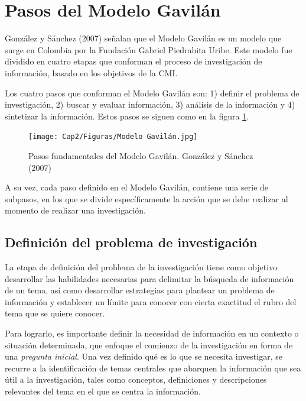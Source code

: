 \section{Pasos del Modelo Gavilán}
\label{secPasosCap2}

González y Sánchez (2007) señalan que el Modelo Gavilán es un modelo que surge en Colombia por la Fundación Gabriel Piedrahita Uribe. Este modelo fue dividido en cuatro etapas que conforman el proceso de investigación de información, basado en los objetivos de la CMI.

Los cuatro pasos que conforman el Modelo Gavilán son: 1) definir el problema de investigación, 2) buscar y evaluar información, 3) análisis de la información y 4) sintetizar la información. Estos pasos se siguen como en la figura \ref{fig:22}.

\begin{figure}[H]
  \centering
  \texttt{[image: Cap2/Figuras/Modelo Gavilán.jpg]}
  \caption{Pasos fundamentales del Modelo Gavilán. González y Sánchez (2007)}
  \label{fig:22}
\end{figure}

A su vez, cada paso definido en el Modelo Gavilán, contiene una serie de subpasos, en los que se divide específicamente la acción que se debe realizar al momento de realizar una investigación.


\subsection{Definición del problema de investigación}
\label{secPaso1Cap2}

La etapa de definición del problema de la investigación tiene como objetivo desarrollar las habilidades necesarias para delimitar la búsqueda de información de un tema, así como desarrollar estrategias para plantear un problema de información y establecer un límite para conocer con cierta exactitud el rubro del tema que se quiere conocer.

Para lograrlo, es importante definir la necesidad de información en un contexto o situación determinada, que enfoque el comienzo de la investigación en forma de una \textit{pregunta inicial}. Una vez definido qué es lo que se necesita investigar, se recurre a la identificación de temas centrales que abarquen la información que sea útil a la investigación, tales como conceptos, definiciones y descripciones relevantes del tema en el que se centra la información.


